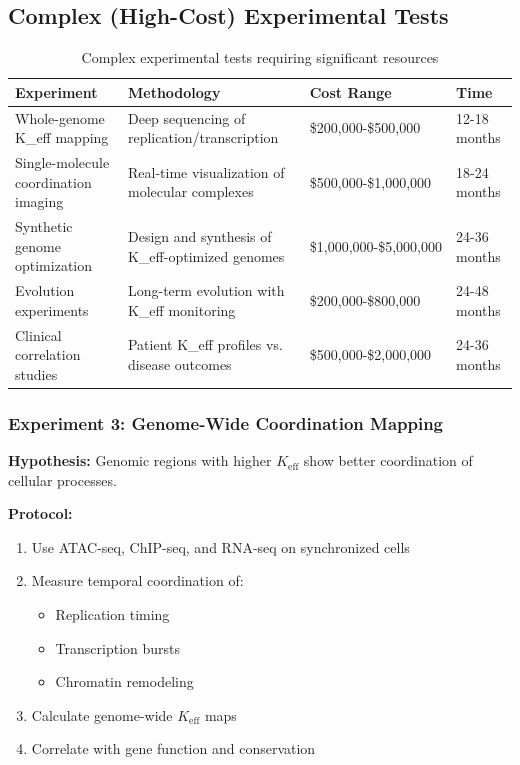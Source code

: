 \documentclass[12pt]{article}
\begin{document}
	\subsection{Complex (High-Cost) Experimental Tests}
	
	\begin{table}[H]
		\centering
		\caption{Complex experimental tests requiring significant resources}
		\begin{tabular}{p{4cm}p{5cm}p{3cm}p{2cm}}
			\toprule
			\textbf{Experiment} & \textbf{Methodology} & \textbf{Cost Range} & \textbf{Time} \\
			\midrule
			Whole-genome K\_eff mapping & Deep sequencing of replication/transcription & \$200,000-\$500,000 & 12-18 months \\
			Single-molecule coordination imaging & Real-time visualization of molecular complexes & \$500,000-\$1,000,000 & 18-24 months \\
			Synthetic genome optimization & Design and synthesis of K\_eff-optimized genomes & \$1,000,000-\$5,000,000 & 24-36 months \\
			Evolution experiments & Long-term evolution with K\_eff monitoring & \$200,000-\$800,000 & 24-48 months \\
			Clinical correlation studies & Patient K\_eff profiles vs. disease outcomes & \$500,000-\$2,000,000 & 24-36 months \\
			\bottomrule
		\end{tabular}
	\end{table}
	
	\subsubsection{Experiment 3: Genome-Wide Coordination Mapping}
	\textbf{Hypothesis:} Genomic regions with higher $K_{\text{eff}}$ show better coordination of cellular processes.
	
	\textbf{Protocol:}
	\begin{enumerate}
		\item Use ATAC-seq, ChIP-seq, and RNA-seq on synchronized cells
		\item Measure temporal coordination of:
		\begin{itemize}
			\item Replication timing
			\item Transcription bursts
			\item Chromatin remodeling
		\end{itemize}
		\item Calculate genome-wide $K_{\text{eff}}$ maps
		\item Correlate with gene function and conservation
	\end{enumerate}
	
\end{document}
